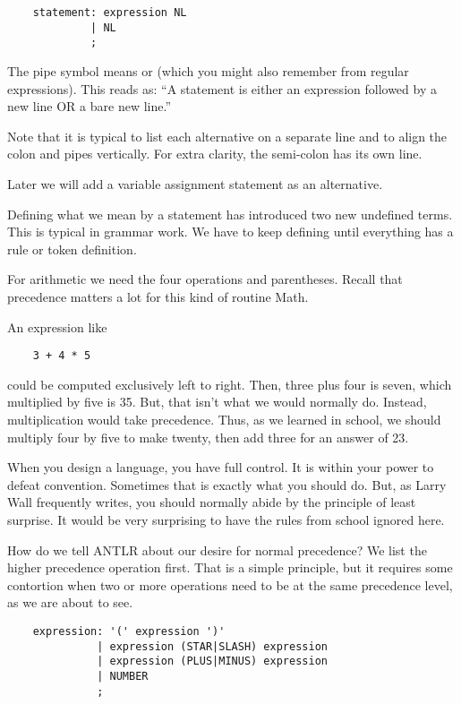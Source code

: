 {\footnotesize
\begin{verbatim}
    statement: expression NL
             | NL
             ;
\end{verbatim}
}

The pipe symbol means or (which you might also remember from regular
expressions). This reads as: ``A statement is either an expression
followed by a new line OR a bare new line.''

Note that it is typical to list each alternative on a separate line
and to align the colon and pipes vertically. For extra clarity,
the semi-colon has its own line.

Later we will add a variable assignment statement as an alternative.

Defining what we mean by a statement has introduced two new undefined
terms. This is typical in grammar work. We have to keep defining
until everything has a rule or token definition.

For arithmetic we need the four operations and parentheses. Recall
that precedence matters a lot for this kind of routine Math.

An expression like

{\footnotesize
\begin{verbatim}
    3 + 4 * 5
\end{verbatim}
}

could be computed exclusively left to right. Then, three plus four
is seven, which multiplied by five is 35. But, that isn't what we
would normally do. Instead, multiplication would take precedence.
Thus, as we learned in school, we should multiply four by five to
make twenty, then add three for an answer of 23.

When you design a language, you have full control. It is within your
power to defeat convention. Sometimes that is exactly what you should
do. But, as Larry Wall frequently writes, you should normally abide
by the principle of least surprise. It would be very surprising to
have the rules from school ignored here.

How do we tell ANTLR about our desire for normal precedence?
We list the higher precedence operation first. That is a simple
principle, but it requires some contortion when two or more operations
need to be at the same precedence level, as we are about to see.

{\footnotesize
\begin{verbatim}
    expression: '(' expression ')'
              | expression (STAR|SLASH) expression
              | expression (PLUS|MINUS) expression
              | NUMBER
              ;
\end{verbatim}
}

